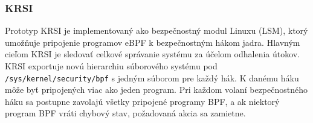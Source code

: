 \subsubsection{KRSI}
Prototyp KRSI je implementovaný ako bezpečnostný modul Linuxu (LSM), ktorý umožňuje pripojenie programov eBPF k bezpečnostným hákom jadra.
Hlavným cieľom KRSI je sledovať celkové správanie systému za účelom odhalenia útokov. 
KRSI exportuje novú hierarchiu súborového systému pod \texttt{/sys/kernel/security/bpf} s jedným súborom pre každý hák.
K danému háku môže byť pripojených viac ako jeden program.
Pri každom volaní bezpečnostného háku sa postupne zavolajú všetky pripojené programy BPF, a ak niektorý program BPF vráti chybový stav, 
požadovaná akcia sa zamietne.















